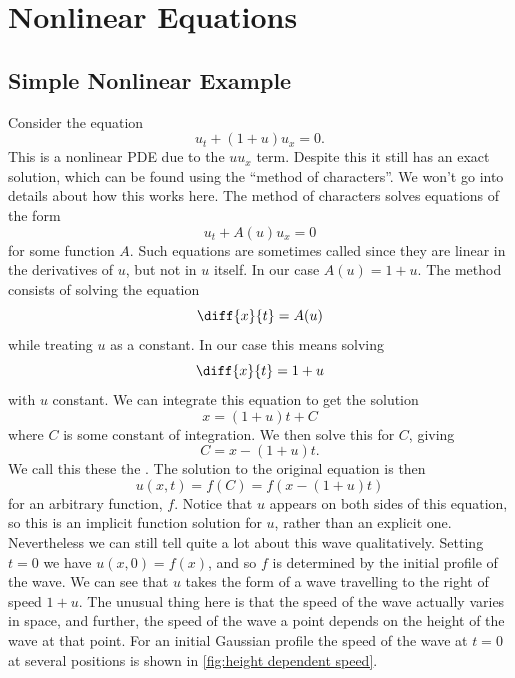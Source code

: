 \documentclass[fleqn]{NotesClass}
\begin{document}
    \chapter{Nonlinear Equations}
    \section{Simple Nonlinear Example}
    Consider the equation
    \begin{equation}
        u_t + (1 + u)u_x = 0.
    \end{equation}
    This is a nonlinear PDE due to the \(uu_x\) term.
    Despite this it still has an exact solution, which can be found using the \enquote{method of characters}.
    We won't go into details about how this works here.
    The method of characters solves equations of the form
    \begin{equation}
        u_t + A(u) u_x = 0
    \end{equation}
    for some function \(A\).
    Such equations are sometimes called  since they are linear in the derivatives of \(u\), but not in \(u\) itself.
    In our case \(A(u) = 1 + u\).
    The method consists of solving the equation
    \begin{equation}
        \diff{x}{t} = A(u)
    \end{equation}
    while treating \(u\) as a constant.
    In our case this means solving
    \begin{equation}
        \diff{x}{t} = 1 + u
    \end{equation}
    with \(u\) constant.
    We can integrate this equation to get the solution
    \begin{equation}
        x = (1 + u)t + C
    \end{equation}
    where \(C\) is some constant of integration.
    We then solve this for \(C\), giving
    \begin{equation}
        C = x - (1 + u)t.
    \end{equation}
    We call this these the .
    The solution to the original equation is then
    \begin{equation}
        u(x, t) = f(C) = f(x - (1 + u)t)
    \end{equation}
    for an arbitrary function, \(f\).
    Notice that \(u\) appears on both sides of this equation, so this is an implicit function solution for \(u\), rather than an explicit one.
    Nevertheless we can still tell quite a lot about this wave qualitatively.
    Setting \(t = 0\) we have \(u(x, 0) = f(x)\), and so \(f\) is determined by the initial profile of the wave.
    We can see that \(u\) takes the form of a wave travelling to the right of speed \(1 + u\).
    The unusual thing here is that the speed of the wave actually varies in space, and further, the speed of the wave a point depends on the height of the wave at that point.
    For an initial Gaussian profile the speed of the wave at \(t = 0\) at several positions is shown in \cref{fig:height dependent speed}.
    
\end{document}
